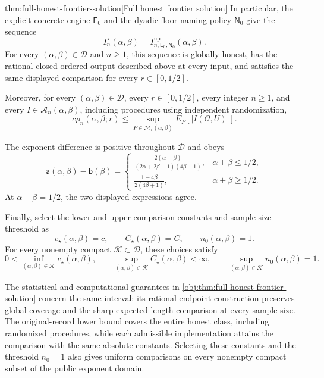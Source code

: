 \begin{theoremv}{thm:full-honest-frontier-solution}[Full honest frontier solution]
In particular, the explicit concrete engine \(\mathsf E_0\) and the dyadic-floor naming policy \(\mathsf N_0\) give the sequence
\[
I_n^\star(\alpha,\beta)
=I^{\mathrm{up}}_{n,\mathsf E_0,\mathsf N_0}(\alpha,\beta).
\]
For every \((\alpha,\beta)\in\mathcal D\) and \(n\ge1\), this sequence is globally honest, has the rational closed ordered output described above at every input, and satisfies the same displayed comparison for every \(r\in[0,1/2]\).

Moreover, for every \((\alpha,\beta)\in\mathcal D\), every \(r\in[0,1/2]\), every integer \(n\ge1\), and every \(I\in\mathcal A_n(\alpha,\beta)\), including procedures using independent randomization,
\[
c\rho_n(\alpha,\beta;r)
\le
\sup_{P\in\mathcal M_r(\alpha,\beta)}
E_P\!\left[|I(\mathcal O,U)|\right].
\]

The exponent difference is positive throughout \(\mathcal D\) and obeys
\[
\mathsf a(\alpha,\beta)-\mathsf b(\beta)=
\begin{cases}
\displaystyle
\frac{2(\alpha-\beta)}
{(2\alpha+2\beta+1)(4\beta+1)},
&\alpha+\beta\le1/2,\\[6pt]
\displaystyle
\frac{1-4\beta}{2(4\beta+1)},
&\alpha+\beta\ge1/2.
\end{cases}
\]
At \(\alpha+\beta=1/2\), the two displayed expressions agree.

Finally, select the lower and upper comparison constants and sample-size threshold as
\[
c_\star(\alpha,\beta)=c,\qquad
C_\star(\alpha,\beta)=C,\qquad
n_0(\alpha,\beta)=1.
\]
For every nonempty compact \(\mathcal K\subset\mathcal D\), these choices satisfy
\[
0<
\inf_{(\alpha,\beta)\in\mathcal K}c_\star(\alpha,\beta),
\qquad
\sup_{(\alpha,\beta)\in\mathcal K}C_\star(\alpha,\beta)<\infty,
\qquad
\sup_{(\alpha,\beta)\in\mathcal K}n_0(\alpha,\beta)=1.
\]
\end{theoremv}

The statistical and computational guarantees in \cref{obj:thm:full-honest-frontier-solution} concern the same interval: its rational endpoint construction preserves global coverage and the sharp expected-length comparison at every sample size. The original-record lower bound covers the entire honest class, including randomized procedures, while each admissible implementation attains the comparison with the same absolute constants. Selecting these constants and the threshold \(n_0=1\) also gives uniform comparisons on every nonempty compact subset  of the public exponent domain.
